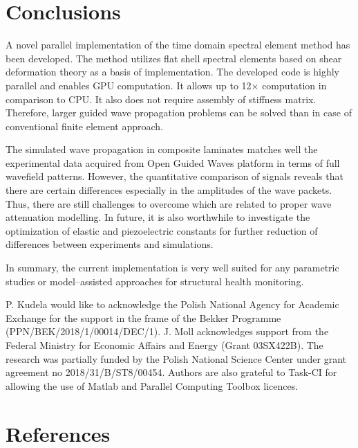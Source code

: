 \section{Conclusions}
A novel parallel implementation of the time domain spectral element method has been developed. The method utilizes flat shell spectral elements based on   shear deformation theory as a basis of implementation. The developed code is highly parallel and enables GPU computation. It allows up to 12\(\times\) computation   in comparison to CPU. It also does not require assembly of  stiffness matrix. Therefore, larger guided wave propagation problems can be solved than in case of conventional finite element approach.

The simulated wave propagation in composite laminates matches well the experimental data acquired from Open Guided Waves platform in terms of full wavefield patterns. However, the quantitative comparison of signals reveals that there are certain differences especially in the amplitudes of the wave packets. Thus, there are still challenges to overcome which are related to proper wave attenuation modelling. In future, it is also worthwhile to investigate the optimization of elastic and piezoelectric constants for further reduction of differences between experiments and simulations.

In summary, the current implementation is very well suited for any parametric studies or model--assisted approaches for structural health monitoring.



\ack
P. Kudela would like to acknowledge the Polish National Agency for Academic Exchange for the support in the frame of the Bekker Programme (PPN/BEK/2018/1/00014/DEC/1). J. Moll acknowledges support from the Federal Ministry for
Economic Affairs and Energy (Grant 03SX422B). The research was partially funded by the Polish National Science Center under grant agreement no 2018/31/B/ST8/00454. Authors are also grateful to Task-CI for allowing the use of Matlab and Parallel Computing Toolbox licences. 

\section*{References}



